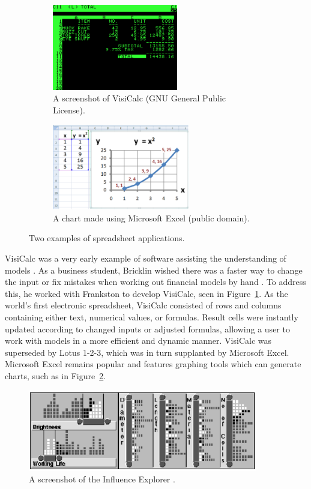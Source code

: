 \begin{figure}
\centering
	\begin{subfigure}[b]{0.475\textwidth}
		\centering
		\includegraphics[height=3.75cm]{figures/eps/visicalc.eps}
		\caption{A screenshot of VisiCalc (GNU General Public License).}
		\label{fig:visicalc}
	\end{subfigure}	
	\begin{subfigure}[b]{0.475\textwidth}
		\centering
		\includegraphics[height=3.75cm]{figures/eps/excel.eps}
		\caption{A chart made using Microsoft Excel (public domain).}
		\label{fig:excel}
	\end{subfigure}
	\caption{Two examples of spreadsheet applications.}
	\label{fig:spreadsheets}
\end{figure}

VisiCalc was a very early example of software assisting the understanding of models \cite{grad2007}.  As a business student, Bricklin wished there was a faster way to change the input or fix mistakes when working out financial models by hand \cite{bricklin1999}.  To address this, he worked with Frankston to develop VisiCalc, seen in Figure~\ref{fig:visicalc}.  As the world's first electronic spreadsheet, VisiCalc consisted of rows and columns containing either text, numerical values, or formulas.  Result cells were instantly updated according to changed inputs or adjusted formulas, allowing a user to work with models in a more efficient and dynamic manner.  VisiCalc was superseded by Lotus 1-2-3, which was in turn supplanted by Microsoft Excel.  Microsoft Excel remains popular and features graphing tools which can generate charts, such as in Figure~\ref{fig:excel}.

\begin{figure}[h]
	\centering
	\includegraphics[width=10cm]{figures/eps/influenceExplorer.eps}
	\caption{A screenshot of the Influence Explorer \cite{tweedie1995}.}
	\label{fig:influenceExplorer}
\end{figure}

